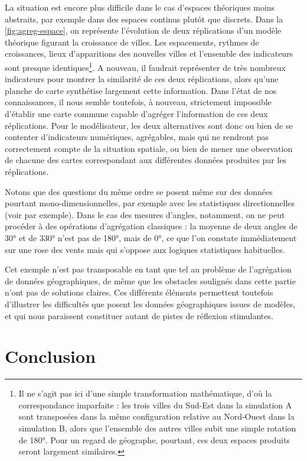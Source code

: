 \documentclass[a4paper, 12pt]{article}
\begin{document}
La situation est encore plus difficile dans le cas d'espaces théoriques moins abstraits, par exemple dans des espaces continus plutôt que discrets.
Dans la \cref{fig:agreg-espace}, on représente l'évolution de deux réplications d'un modèle théorique figurant la croissance de villes.
Les espacements, rythmes de croissances, lieux d'apparitions des nouvelles villes et l'ensemble des indicateurs sont presque identiques\footnote{
Il ne s'agit pas ici d'une simple transformation mathématique, d'où la correspondance imparfaite : les trois villes du Sud-Est dans la simulation A sont transposées dans la même configuration relative au Nord-Ouest dans la simulation B, alors que l'ensemble des autres villes subit une simple rotation de 180°.
Pour un regard de géographe, pourtant, ces deux espaces produits seront largement similaires.
}.
A nouveau, il faudrait représenter de très nombreux indicateurs pour montrer la similarité de ces deux réplications, alors qu'une planche de carte synthétise largement cette information.
Dans l'état de nos connaissances, il nous semble toutefois, à nouveau, strictement impossible d'établir une carte commune capable d'agréger l'information de ces deux réplications.
Pour le modélisateur, les deux alternatives sont donc ou bien de se contenter d'indicateurs numériques, agrégables, mais qui ne rendront pas correctement compte de la situation spatiale, ou bien de mener une observation de chacune des cartes correspondant aux différentes données produites par les réplications.

Notons que des questions du même ordre se posent même sur des données pourtant mono-dimensionnelles, par exemple avec les statistiques directionnelles (voir \cite{laloux_les_2015} par exemple).
Dans le cas des mesures d'angles, notamment, on ne peut procéder à des opérations d'agrégation classiques : la moyenne de deux angles de 30° et de 330° n'est pas de 180°, mais de 0°, ce que l'on constate immédiatement sur une rose des vents mais qui s'oppose aux logiques statistiques habituelles.

\bigskip
Cet exemple n'est pas transposable en tant que tel au problème de l'agrégation de données géographiques, de même que les obstacles soulignés dans cette partie n'ont pas de solutions claires.
Ces différents éléments permettent toutefois d'illustrer les difficultés que posent les données géographiques issues de modèles, et qui nous paraissent constituer autant de pistes de réflexion stimulantes.


\section*{Conclusion}
\end{document}
